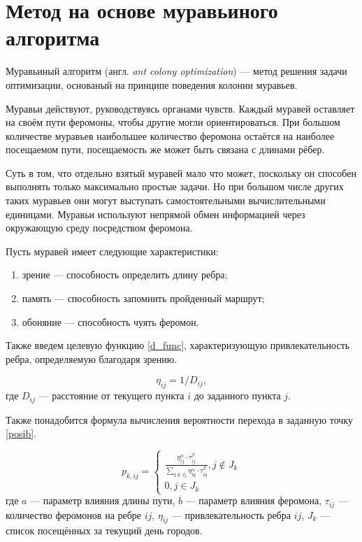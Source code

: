 \section{Метод на основе муравьиного алгоритма}

Муравьиный алгоритм (англ. \textit{ant colony optimization}) \cite{fullcomb} --- метод решения задачи оптимизации, основаный на принципе поведения колонии муравьев.

Муравьи действуют, руководствуясь органами чувств. 
Каждый муравей оставляет на своём пути феромоны, чтобы другие могли ориентироваться. 
При большом количестве муравьев наибольшее количество феромона остаётся на наиболее посещаемом пути, посещаемость же может быть связана с длинами рёбер.

Суть в том, что отдельно взятый муравей мало что может, поскольку он способен выполнять только максимально простые задачи. Но при большом числе других таких муравьев они могут выступать самостоятельными вычислительными единицами. Муравьи используют непрямой обмен информацией через окружающую среду посредством феромона.


Пусть муравей имеет следующие характеристики:
\begin{enumerate}[label=\arabic*.]
	\item зрение --- способность определить длину ребра;
	\item память --- способность запомнить пройденный маршрут;
	\item обоняние --- способность чуять феромон.
\end{enumerate}


Также введем целевую функцию \eqref{d_func}, характеризующую привлекательность ребра, определяемую благодаря зрению.

\begin{equation}
	\label{d_func}
	\eta_{ij} = 1 / D_{ij},
\end{equation}
где $D_{ij}$ — расстояние от текущего пункта $i$ до заданного пункта $j$.


Также понадобится формула вычисления вероятности перехода в заданную точку \eqref{posib}.

\begin{equation}
	\label{posib}
	p_{k,ij} = \begin{cases}
		\frac{\eta_{ij}^{\alpha}\cdot\tau_{ij}^{\beta}}{\sum_{q\notin J_k} \eta^\alpha_{iq}\cdot\tau^\beta_{iq}}, j \notin J_k \\
		0, j \in J_k
	\end{cases}
\end{equation}
где $a$ --- параметр влияния длины пути, $b$ --- параметр влияния феромона, $\tau_{ij}$ --- количество феромонов на ребре $ij$, $\eta_{ij}$ --- привлекательность ребра $ij$, $J_k$ --- список посещённых за текущий день городов.

